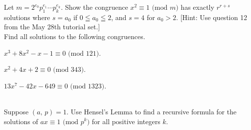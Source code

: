 \documentclass[a4paper,11pt]{article}
\theoremstyle{mythm}
\theoremstyle{mydef}
\renewcommand{\pmod}[1]{\text{ (mod $#1$)}}
\begin{document}
 Let $m=2^{e_0}p_1^{e_1} \cdots p_k^{e_k}$. Show the
congruence $x^2 \equiv 1 \pmod{m}$ has exactly $r^{r+s}$ solutions where $s=a_0$
if $0 \leqq a_0 \leqq 2$, and $s=4$ for $a_0>2$. [Hint: Use question 12 from the
May 28th tutorial set.] \\

 Find all solutions to the following congruences.
\begin{enumerate*}[(a)]
\item $x^3+8x^2-x-1 \equiv 0 \pmod{121}$.
\item $x^2+4x+2 \equiv 0 \pmod{343}$.
\item $13x^7-42x-649 \equiv 0 \pmod{1323}$.
\end{enumerate*} \\

 Suppose $(a,\,p)=1$. Use Hensel's Lemma to find a
recursive formula for the solutions of $ax \equiv 1 \pmod{p^k}$ for all positive
integers $k$. \\
\end{document}
